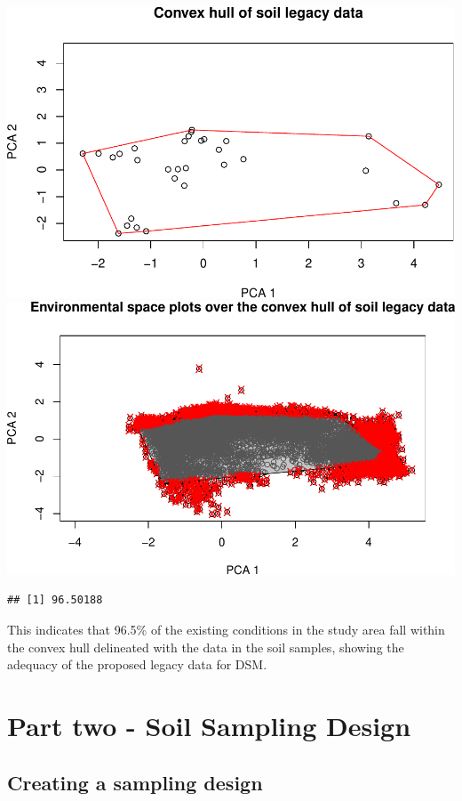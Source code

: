 \documentclass[
]{book}
\begin{document}
\includegraphics{Technical-Manual-Soil-Sampling-Design_files/figure-latex/fig-4-1.pdf} \includegraphics{Technical-Manual-Soil-Sampling-Design_files/figure-latex/fig-4-2.pdf}

\begin{verbatim}
## [1] 96.50188
\end{verbatim}

This indicates that 96.5\% of the existing conditions in the study area fall within the convex hull delineated with the data in the soil samples, showing the adequacy of the proposed legacy data for DSM.

\hypertarget{part-part-two---soil-sampling-design}{%
\part{Part two - Soil Sampling Design}\label{part-part-two---soil-sampling-design}}

\hypertarget{creating-a-sampling-design}{%
\chapter{Creating a sampling design}\label{creating-a-sampling-design}}
\end{document}
